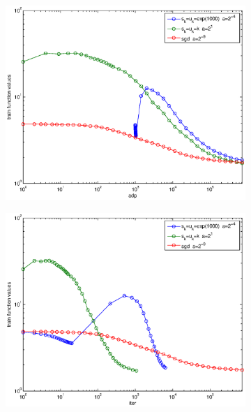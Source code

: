 \documentclass[12pt]{article}
\begin{document}
	\begin{figure}[H]
	\begin{subfigure}[b]{.5\linewidth}
		        \includegraphics[width=4in]{Figures/18-2-1.eps}
	\end{subfigure}%
	\begin{subfigure}[b]{.5\linewidth}
		        \includegraphics[width=4in]{Figures/18-2-2.eps}
	\end{subfigure}%


\end{figure}
\end{document}
